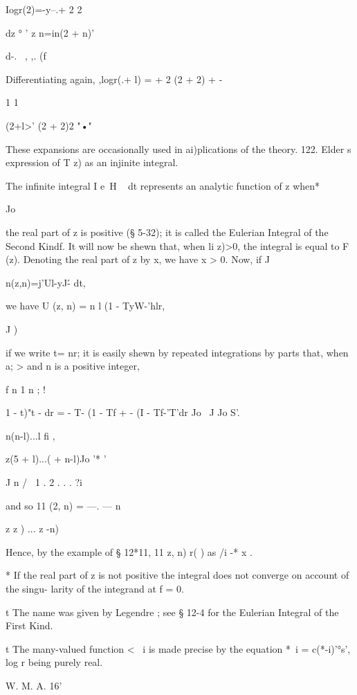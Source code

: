 Iogr(2)=-y--.+ 2 2 



dz ° ' z n=in(2 + n)' 

d-. \ , ,. (f 



Differentiating again,  ,logr(.+ l) =     + 2 (2 + 2) + -  



1 1 

 (2+l>'  (2 + 2)2 "•"  



These expansions are occasionally used in ai)plications of the theory. 
122. Elder s expression of T  z) as an injinite integral. 

The infinite integral I e~H ~ dt represents an analytic function of z when* 

Jo 

the real part of z is positive (§ 5-32); it is called the Eulerian Integral of the 
Second Kindf. It will now be shewn that, when li z)>0, the integral is 
equal to F (z). Denoting the real part of z by x, we have x > 0. Now, if J 

n(z,n)=j'Ul-yJ\'- dt, 

we have U (z, n) = n  l (1 - TyW-'hlr, 

J  )  

if we write t= nr; it is easily shewn by repeated integrations by parts that, 
when a; > and n is a positive integer, 

f  n 1  n ; ! 

 1 - t)"t -  dr = - T- (1 - Tf + - (I - Tf-'T'dr   
Jo \ J Jo  S'. 

n(n-l)...l fi   , 

z(5 + l)...(  + n-l)Jo '* ' 

J n / \ 1 . 2 . . . ?i 

and so 11 (2, n) = —. — n  

z z   )  ... z -n) 

Hence, by the example of § 12*11, 11  z, n)   r( ) as /i -* x . 

* If the real part of z is not positive the integral does not converge on account of the singu- 
larity of the integrand at f = 0. 

t The name was given by Legendre ; see § 12-4 for the Eulerian Integral of the First Kind. 

t The many-valued function < ~i is made precise by the equation  *~i = c(*-i)'°s', log r being 
purely real. 

W. M. A. 16' 




